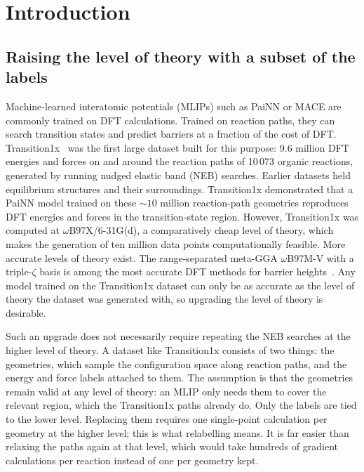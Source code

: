 \chapter{Introduction}
\label{ch:introduction}

\section{Raising the level of theory with a subset of the labels}

Machine-learned interatomic potentials (MLIPs) such as PaiNN or MACE
are commonly trained on DFT calculations. Trained on reaction paths,
they can search transition states and predict barriers at a fraction
of the cost of DFT. Transition1x~\cite{schreiner2022} was the first
large dataset built for this purpose: 9.6 million DFT energies and
forces on and around the reaction paths of 10\,073 organic reactions,
generated by running nudged elastic band (NEB) searches. Earlier
datasets held equilibrium structures and their surroundings.
Transition1x demonstrated that a PaiNN model trained on these
${\sim}10$ million reaction-path geometries reproduces DFT energies
and forces in the transition-state region. However,
Transition1x was computed at \mbox{$\omega$B97X/6-31G(d)}, a
comparatively cheap level of theory, which makes the generation of
ten million data points computationally feasible. More accurate
levels of theory exist. The range-separated
meta-GGA $\omega$B97M-V with a triple-$\zeta$ basis is among the most
accurate DFT methods for barrier heights~\cite{mardirossian2016,
najibi2018}. Any model trained on the Transition1x dataset can only
be as accurate as the level of theory the dataset was generated with,
so upgrading the level of theory is desirable.

Such an upgrade does not necessarily require repeating the NEB searches at the
higher level of theory. A dataset like Transition1x consists of two
things: the geometries, which sample the configuration space along
reaction paths, and the energy and force labels attached to them. The
assumption is that the geometries remain valid at any level of theory:
an MLIP only needs them to cover the relevant region, which the
Transition1x paths already do. Only the labels are tied to the lower
level. Replacing them requires one single-point calculation per geometry at
the higher level; this is what relabelling means. It is far easier
than relaxing the paths again at that level, which would take hundreds
of gradient calculations per reaction instead of one per geometry
kept.

